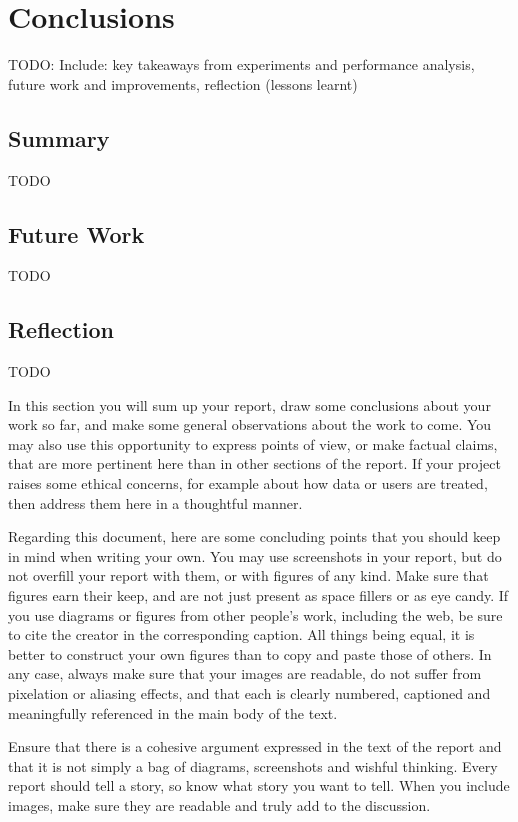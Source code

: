 \chapter{Conclusions}

TODO: Include: key takeaways from experiments and performance analysis, future work and improvements, reflection (lessons learnt)

\section{Summary}

TODO

\section{Future Work}

TODO

\section{Reflection}

TODO

In this section you will sum up your report, draw some conclusions about your work so far, and make some
general observations about the work to come. You may also use this opportunity to express points of view,
or make factual claims, that are more pertinent here than in other sections of the report. If your project
raises some ethical concerns, for example about how data or users are treated, then address them here in a
thoughtful manner.

Regarding this document, here are some concluding points that you should keep in mind when writing your own.
You may use screenshots in your report, but do not overfill your report with them, or with figures of any kind.
Make sure that figures earn their keep, and are not just present as space fillers or as eye candy. If you use
diagrams or figures from other people's work, including the web, be sure to cite the creator in the corresponding
caption. All things being equal, it is better to construct your own figures than to copy and paste those of others.
In any case, always make sure that your images are readable, do not suffer from pixelation or aliasing effects,
and that each is clearly numbered, captioned and meaningfully referenced in the main body of the text.

Ensure that there is a cohesive argument expressed in the text of the report and that it is not simply a bag of
diagrams, screenshots and wishful thinking. Every report should tell a story, so know what story you want to tell.
When you include images, make sure they are readable and truly add to the discussion.

